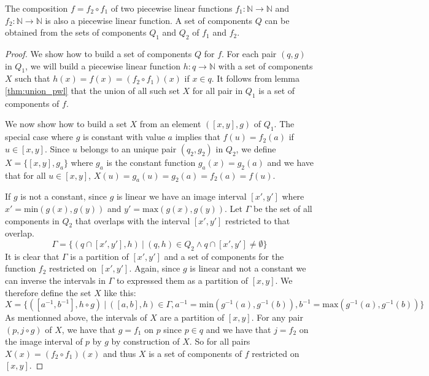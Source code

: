 \begin{lemma}
  The composition $f = f_2 \circ f_1 $ of two piecewise linear functions $f_1 :
  \mathbb{N} \rightarrow \mathbb{N}$ and $f_2 : \mathbb{N} \rightarrow
  \mathbb{N}$ is also a piecewise linear function. A set of components $Q$ can
  be obtained from the sets of components $Q_1$ and $Q_2$ of $f_1$ and $f_2$.
\end{lemma}
\begin{proof}
  We show how to build a set of components $Q$ for $f$. For each pair $(q, g)$
  in $Q_1$, we will build a piecewise linear function $h : q \rightarrow
  \mathbb{N}$ with a set of components $X$ such that $h(x) = f(x) = (f_2 \circ
  f_1)(x)$ if $x \in q$. It follows from lemma \ref{thm:union_pwl} that the
  union of all such set $X$ for all pair in $Q_1$ is a set of components of $f$.
  
  We now show how to build a set $X$ from an element $([x,y], g)$ of $Q_1$.
  The special case where $g$ is constant with value $a$ implies that $f(u) =
  f_2(a)$ if $u \in [x,y]$. Since $u$ belongs to an unique pair $(q_2, g_2)$ in
  $Q_2$, we define $X = \{[x,y], g_a\}$ where $g_a$ is the constant function
  $g_a(x) = g_2(a)$ and we have that for all $u \in [x,y]$, $X(u) = g_a(u) =
  g_2(a) = f_2(a) = f(u)$.

  If $g$ is not a constant, since $g$ is linear we have an image interval $[x',
  y']$ where $x' = \text{min}(g(x),g(y))$ and $y' = \text{max}(g(x),g(y))$. Let
  $\Gamma$ be the set of all components in $Q_2$ that overlaps with the interval
  $[x',y']$ restricted to that overlap.
  \begin{equation*}
    \Gamma = \{(q \cap [x',y'], h) \ | \ (q, h) \in Q_2 \land q \cap [x',y'] \neq \emptyset \}
  \end{equation*}
  It is clear that $\Gamma$ is a partition of $[x',y']$ and a set of components
  for the function $f_2$ restricted on $[x',y']$. Again, since $g$ is linear and
  not a constant we can inverse the intervals in $\Gamma$ to expressed them as a
  partition of $[x,y]$. We therefore define the set $X$ like this:
  \begin{equation*}
    X = \{([a^{-1}, b^{-1}], h \circ g) \ | \ 
    ([a,b], h) \in \Gamma, 
    a^{-1} = \text{min}(g^{-1}(a), g^{-1}(b)), 
    b^{-1} = \text{max}(g^{-1}(a), g^{-1}(b)) \}
  \end{equation*}
  As mentionned above, the intervals of $X$ are a partition of $[x,y]$. For any
  pair $(p, j \circ g)$ of $X$, we have that $g = f_1$ on $p$ since
  $p \in q$ and we have that $j = f_2$ on the image interval of $p$ by
  $g$ by construction of $X$. So for all pairs $X(x) = (f_2 \circ f_1)(x)$ and
  thus $X$ is a set of components of $f$ restricted on $[x,y]$.

\end{proof}